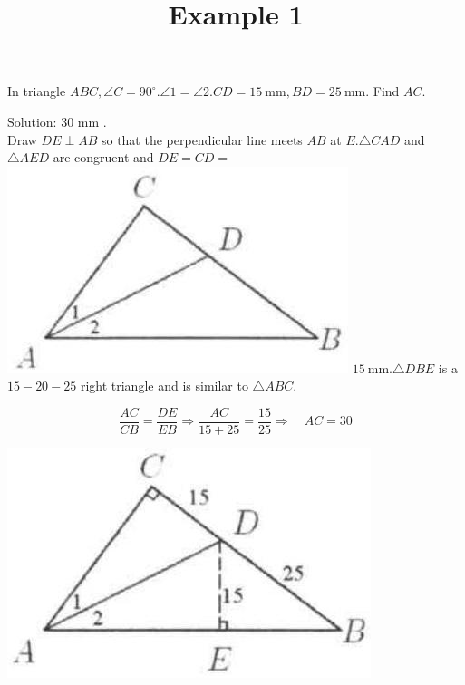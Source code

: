 \documentclass{article}
\title{Example 1}
\date{}
\begin{document}
\maketitle

In triangle \(A B C, \angle C=90^{\circ} . \angle 1=\angle 2 . C D=15 \mathrm{~mm}, B D=25 \mathrm{~mm}\). Find \(A C\).

Solution: 30 mm .\\
Draw \(D E \perp A B\) so that the perpendicular line meets \(A B\) at \(E . \triangle C A D\) and \(\triangle A E D\) are congruent and \(D E=C D=\)\\
\includegraphics[width=\textwidth]{images/problem_image_1.jpg} \(15 \mathrm{~mm} . \triangle D B E\) is a \(15-20-25\) right triangle and is similar to \(\triangle A B C\).

\[
\frac{A C}{C B}=\frac{D E}{E B} \Rightarrow \frac{A C}{15+25}=\frac{15}{25} \Rightarrow \quad A C=30
\]

\begin{center}
\includegraphics[width=\textwidth]{images/reasoning_image_1.jpg}
\end{center}
\end{document}
